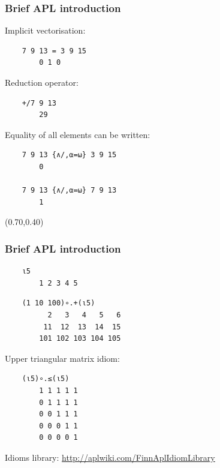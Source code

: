 \documentclass{beamer}
\begin{document}
\begin{frame}[fragile]
\frametitle{Brief APL introduction}


Implicit vectorisation:
\begin{verbatim}
    7 9 13 = 3 9 15
        0 1 0
\end{verbatim}

Reduction operator:
\begin{verbatim}
    +/7 9 13
        29
\end{verbatim}

Equality of all elements can be written:
\begin{verbatim}
    7 9 13 {∧/,⍺=⍵} 3 9 15
        0

    7 9 13 {∧/,⍺=⍵} 7 9 13
        1
\end{verbatim}

\begin{textblock*}{40mm}(0.70\textwidth,0.40\textheight)
\end{textblock*}

\end{frame}

\begin{frame}[fragile]
\frametitle{Brief APL introduction}

\begin{verbatim}
    ⍳5
        1 2 3 4 5
\end{verbatim}

\begin{verbatim}
    (1 10 100)∘.+(⍳5)
          2   3   4   5   6
         11  12  13  14  15
        101 102 103 104 105
\end{verbatim}

Upper triangular matrix idiom:
\begin{verbatim}
    (⍳5)∘.≤(⍳5)
        1 1 1 1 1
        0 1 1 1 1
        0 0 1 1 1
        0 0 0 1 1
        0 0 0 0 1
\end{verbatim}


Idioms library: \url{http://aplwiki.com/FinnAplIdiomLibrary}

\end{frame}
\end{document}
